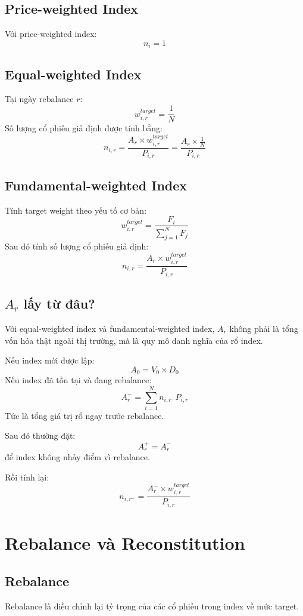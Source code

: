 \subsection{Price-weighted Index}
Với price-weighted index:
\[
n_i=1
\]

\subsection{Equal-weighted Index}
Tại ngày rebalance \(r\):
\[
w_{i,r}^{target}
=
\frac{1}{N}
\]
Số lượng cổ phiếu giả định được tính bằng:
\[
n_{i,r}
= \frac{A_r \times w_{i,r}^{target}}{P_{i,r}}
= \frac{A_r \times \frac{1}{N}}{P_{i,r}}
\]

\subsection{Fundamental-weighted Index}
Tính target weight theo yếu tố cơ bản:
\[
w_{i,r}^{target}
=
\frac{F_i}{\sum_{j=1}^{N}F_j}
\]
Sau đó tính số lượng cổ phiếu giả định:
\[
n_{i,r}
=
\frac{A_r \times w_{i,r}^{target}}{P_{i,r}}
\]

\subsection{\texorpdfstring{\(A_r\)}{Ar} lấy từ đâu?}
Với equal-weighted index và fundamental-weighted index, \(A_r\) không phải là tổng vốn hóa thật ngoài thị trường, mà là quy mô danh nghĩa của rổ index.

Nếu index mới được lập:
\[
A_0
=
V_0 \times D_0
\]
Nếu index đã tồn tại và đang rebalance:
\[
A_r^-
=
\sum_{i=1}^{N} n_{i,r^-}P_{i,r}
\]
Tức là tổng giá trị rổ ngay trước rebalance.

Sau đó thường đặt:
\[
A_r^+ = A_r^-
\]
để index không nhảy điểm vì rebalance.

Rồi tính lại:
\[
n_{i,r^+}
=
\frac{A_r^- \times w_{i,r}^{target}}{P_{i,r}}
\]

\section{Rebalance và Reconstitution}
\label{sec:app_index_rebalance_reconstitution}
\subsection{Rebalance}

Rebalance là điều chỉnh lại tỷ trọng của các cổ phiếu trong index về mức target.

